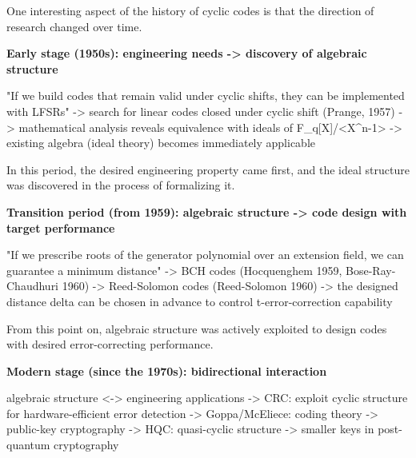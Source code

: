 \documentclass[
]{article}
\newenvironment{Shaded}{}{}
\newcommand{\NormalTok}[1]{#1}
\begin{document}
One interesting aspect of the history of cyclic codes is that the
direction of research changed over time.

\textbf{Early stage (1950s): engineering needs -\textgreater{} discovery
of algebraic structure}

\begin{Shaded}
\begin{Highlighting}[]
\NormalTok{"If we build codes that remain valid under cyclic shifts, they can be implemented with LFSRs"}
\NormalTok{    {-}\textgreater{} search for linear codes closed under cyclic shift (Prange, 1957)}
\NormalTok{    {-}\textgreater{} mathematical analysis reveals equivalence with ideals of F\_q[X]/\textless{}X\^{}n{-}1\textgreater{}}
\NormalTok{    {-}\textgreater{} existing algebra (ideal theory) becomes immediately applicable}
\end{Highlighting}
\end{Shaded}

In this period, the desired engineering property came first, and the
ideal structure was discovered in the process of formalizing it.

\textbf{Transition period (from 1959): algebraic structure
-\textgreater{} code design with target performance}

\begin{Shaded}
\begin{Highlighting}[]
\NormalTok{"If we prescribe roots of the generator polynomial over an extension field, we can guarantee a minimum distance"}
\NormalTok{    {-}\textgreater{} BCH codes (Hocquenghem 1959, Bose{-}Ray{-}Chaudhuri 1960)}
\NormalTok{    {-}\textgreater{} Reed{-}Solomon codes (Reed{-}Solomon 1960)}
\NormalTok{    {-}\textgreater{} the designed distance delta can be chosen in advance to control t{-}error{-}correction capability}
\end{Highlighting}
\end{Shaded}

From this point on, algebraic structure was actively exploited to design
codes with desired error-correcting performance.

\textbf{Modern stage (since the 1970s): bidirectional interaction}

\begin{Shaded}
\begin{Highlighting}[]
\NormalTok{algebraic structure \textless{}{-}\textgreater{} engineering applications}
\NormalTok{    {-}\textgreater{} CRC: exploit cyclic structure for hardware{-}efficient error detection}
\NormalTok{    {-}\textgreater{} Goppa/McEliece: coding theory {-}\textgreater{} public{-}key cryptography}
\NormalTok{    {-}\textgreater{} HQC: quasi{-}cyclic structure {-}\textgreater{} smaller keys in post{-}quantum cryptography}
\end{Highlighting}
\end{Shaded}
\end{document}
